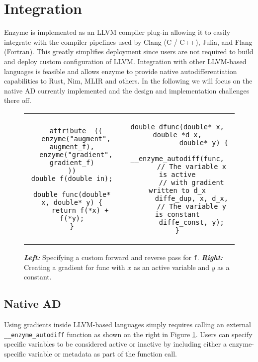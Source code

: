 \section{Integration}
\label{sec:integration}

Enzyme is implemented as an LLVM compiler plug-in allowing it to easily integrate with the compiler pipelines used by Clang (C / C++), Julia, and Flang (Fortran).  This greatly simplifies deployment since users are not required to build and deploy custom configuration of LLVM. Integration with other LLVM-based languages is feasible and allows enzyme to provide native autodifferentiation capabilities to Rust, Nim, MLIR and others. In the following we will focus on the native AD currently implemented and the design and implementation challenges there off.

\begin{figure}
    \centering
\begin{tabular}{c|c}
\begin{minipage}[T]{0.49\linewidth}
\begin{verbatim}
__attribute__((
  enzyme("augment", augment_f),
  enzyme("gradient", gradient_f)
))
double f(double in);

double func(double* x, double* y) {
    return f(*x) + f(*y);
}
\end{verbatim}
\end{minipage}
&
\begin{minipage}[T]{0.49\linewidth}
\begin{verbatim}
double dfunc(double* x, double *d_x,
             double* y) {
    __enzyme_autodiff(func,
       // The variable x is active
       // with gradient written to d_x
       diffe_dup, x, d_x,
       // The variable y is constant
       diffe_const, y);
}
\end{verbatim}
\end{minipage}
\end{tabular}
\caption{\textbf{\textit{Left:}} Specifying a custom forward and reverse pass for \texttt{f}. \textbf{\textit{Right:}} Creating a gradient for func with $x$ as an active variable and $y$ as a constant.}
    \label{fig:native}
\end{figure}

\subsection{Native AD}
\label{sec:native}
Using gradients inside LLVM-based languages simply requires calling an external \texttt{\_\_enzyme\_autodiff} function as shown on the right in Figure \ref{fig:native}. Users can specify specific variables to be considered active or inactive by including either a enzyme-specific variable or metadata as part of the function call. 

